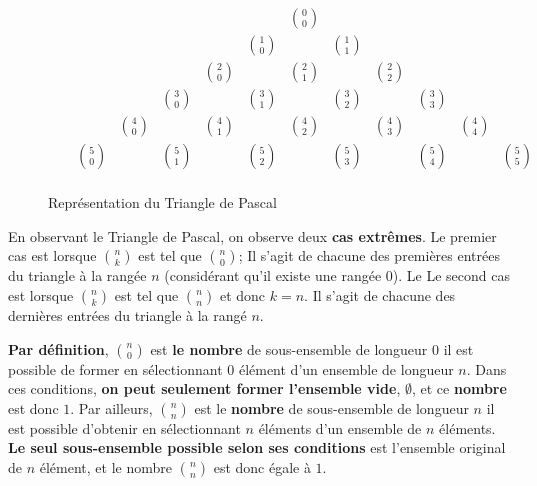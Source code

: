 \documentclass[16pt]{report}
\begin{document}
\begin{multicols*}{2}
    \begin{figure}[H]
\[
        \begin{array}{ccccccccccccccccc}
         & & & & & & & \binom{0}{0} & & & & & & & & \\
         & & & & & & \binom{1}{0} & & \binom{1}{1} & & & & & & & \\
         & & & & & \binom{2}{0} & & \binom{2}{1} & & \binom{2}{2} & & & & & & \\
         & & & & \binom{3}{0} & & \binom{3}{1} & & \binom{3}{2} & & \binom{3}{3} & & & & & \\
         & & & \binom{4}{0} & & \binom{4}{1} & & \binom{4}{2} & & \binom{4}{3} & & \binom{4}{4} & & & & \\
         & & \binom{5}{0} & & \binom{5}{1} & & \binom{5}{2} & & \binom{5}{3} & & \binom{5}{4} & & \binom{5}{5} & & & \\
        \end{array}
\]
    \caption{Représentation du Triangle de Pascal}
    \end{figure}

    \begin{Concept*}{}{}
     En observant le Triangle de Pascal, on observe deux \textbf{cas extrêmes}. Le premier cas 
    est lorsque $n \choose k$ est tel que $n \choose 0$; Il s'agit de chacune des premières entrées 
    du triangle à la rangée $n$ (considérant qu'il existe une rangée 0). Le Le second cas 
    est lorsque $n \choose k$ est tel que $n \choose n$ et donc $k = n$. Il s'agit de chacune des 
    dernières entrées du triangle à la rangé $n$.        
    \end{Concept*}


    \begin{note}{}{}
        \textbf{Par définition}, 
        $n \choose 0$ est \textbf{le nombre} de sous-ensemble de longueur $0$ il est possible
        de former en sélectionnant 
        $0$ élément d'un ensemble de longueur $n$. Dans ces conditions,
        \textbf{on peut seulement former l'ensemble vide},
        $\emptyset$, et ce \textbf{nombre} est donc $1$. 
        Par ailleurs, $n \choose n$ est le \textbf{nombre} de sous-ensemble de longueur $n$ il est possible d'obtenir 
        en sélectionnant $n$ éléments d'un ensemble de $n$ éléments. \textbf{Le seul sous-ensemble 
        possible selon ses conditions} est l'ensemble original de $n$ élément, et le nombre 
        $n \choose n$ est donc égale à $1$. 
    \end{note}


\end{multicols*}
\end{document}
